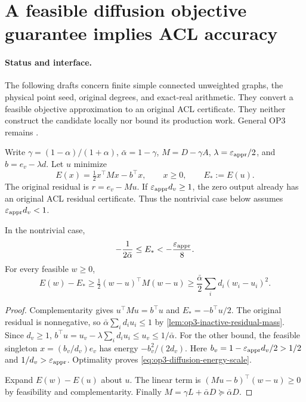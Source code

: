 \section[Diffusion accuracy and ACL]{A feasible diffusion objective guarantee implies ACL accuracy}
\label{sec:op3-diffusion-accuracy}

\paragraph{Status and interface.}
The following \statusproved{} drafts concern finite simple connected
unweighted graphs, the physical point seed, original degrees, and exact-real
arithmetic. They convert a feasible objective approximation to an original
ACL certificate. They neither construct the candidate locally nor bound its
production work. General OP3 remains \statusopen.

Write $\gamma=(1-\alpha)/(1+\alpha)$, $\bar\alpha=1-\gamma$,
$M=D-\gamma A$, $\lambda=\varepsilon_{\mathrm{appr}}/2$, and $b=e_v-\lambda d$.
Let $u$ minimize
\[
 E(x)=\tfrac12x^\top Mx-b^\top x,\qquad x\geq0,
 \qquad E_*:=E(u).
\]
The original residual is $r=e_v-Mu$. If $\varepsilon_{\mathrm{appr}} d_v\geq1$, the zero
output already has an original ACL residual certificate. Thus the
nontrivial case below assumes $\varepsilon_{\mathrm{appr}} d_v<1$.

\begin{lemma}
\label{lem:op3-diffusion-energy-scale}
In the nontrivial case,
\begin{equation}
 -\frac1{2\bar\alpha}\leq E_*< -\frac{\varepsilon_{\mathrm{appr}}}{8}.
 \label{eq:op3-diffusion-energy-scale}
\end{equation}
For every feasible $w\geq0$,
\begin{equation}
 E(w)-E_*\geq\tfrac12(w-u)^\top M(w-u)
 \geq\frac{\bar\alpha}{2}\sum_i d_i(w_i-u_i)^2.
 \label{eq:op3-diffusion-energy-error}
\end{equation}
\end{lemma}
\begin{proof}
Complementarity gives $u^\top Mu=b^\top u$ and
$E_*=-b^\top u/2$. The original residual is nonnegative, so
$\bar\alpha\sum_i d_i u_i\leq1$ by
\cref{lem:op3-inactive-residual-mass}. Since $d_v\geq1$,
$b^\top u=u_v-\lambda\sum_i d_i u_i\leq u_v\leq1/\bar\alpha$.
For the other bound, the feasible singleton
$x=(b_v/d_v)e_v$ has energy $-b_v^2/(2d_v)$.
Here $b_v=1-\varepsilon_{\mathrm{appr}} d_v/2>1/2$ and $1/d_v>\varepsilon_{\mathrm{appr}}$.
Optimality proves \cref{eq:op3-diffusion-energy-scale}.

Expand $E(w)-E(u)$ about $u$. The linear term is
$(Mu-b)^\top(w-u)\geq0$ by feasibility and complementarity.
Finally $M=\gamma L+\bar\alpha D\succeq\bar\alpha D$.
\end{proof}

